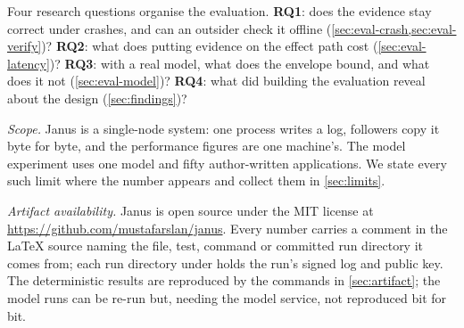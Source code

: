 Four research questions organise the evaluation. \textbf{RQ1}: does the evidence
stay correct under crashes, and can an outsider check it offline
(\cref{sec:eval-crash,sec:eval-verify})? \textbf{RQ2}: what does putting evidence
on the effect path cost (\cref{sec:eval-latency})? \textbf{RQ3}: with a real
model, what does the envelope bound, and what does it not
(\cref{sec:eval-model})? \textbf{RQ4}: what did building the evaluation reveal
about the design (\cref{sec:findings})?

\emph{Scope.} Janus is a single-node system: one process writes a log, followers
copy it byte for byte, and the performance figures are one machine's. The model
experiment uses one model and fifty author-written applications. We state every
such limit where the number appears and collect them in \cref{sec:limits}.

\emph{Artifact availability.} Janus is open source under the MIT license at
\url{https://github.com/mustafarslan/janus}. Every number carries a comment in
the \LaTeX{} source naming the file, test, command or committed run directory it
comes from; each run directory under  holds the run's
signed log and public key. The deterministic results are reproduced by the
commands in \cref{sec:artifact}; the model runs can be re-run but, needing the
model service, not reproduced bit for bit.
